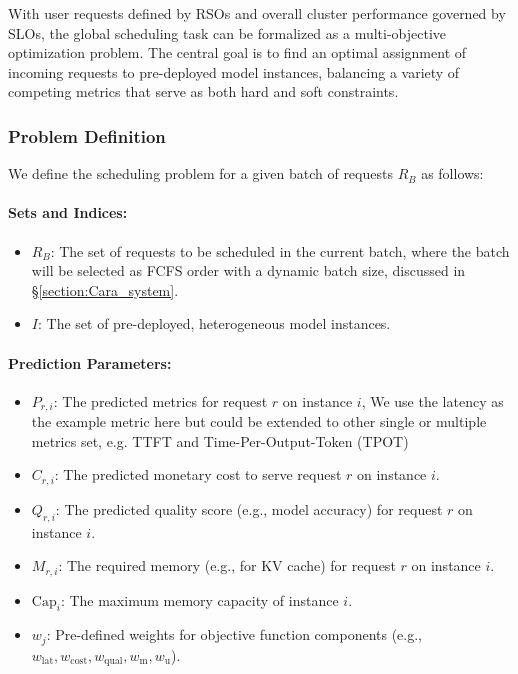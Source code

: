 \documentclass[letterpaper, anonymous, twocolumn, 10pt]{article}
\begin{document}
With user requests defined by RSOs and overall cluster performance governed by SLOs, the global scheduling task can be formalized as a multi-objective optimization problem. The central goal is to find an optimal assignment of incoming requests to pre-deployed model instances, balancing a variety of competing metrics that serve as both hard and soft constraints.

\subsubsection{Problem Definition}
We define the scheduling problem for a given batch of requests $R_B$ as follows:

\paragraph{Sets and Indices:}
\begin{itemize}
    \item $R_B$: The set of requests to be scheduled in the current batch, where the batch will be selected as FCFS order with a dynamic batch size, discussed in \S \ref{section:Cara_system}.
    \item $I$: The set of pre-deployed, heterogeneous model instances.
\end{itemize}

\paragraph{Prediction Parameters:}
\begin{itemize}
    \item $P_{r,i}$: The predicted metrics for request $r$ on instance $i$, 
    We use the latency as the example metric here but could be extended to other single or multiple metrics set, e.g. TTFT and Time-Per-Output-Token  (TPOT)
    \item $C_{r,i}$: The predicted monetary cost to serve request $r$ on instance $i$.
    \item $Q_{r,i}$: The predicted quality score (e.g., model accuracy) for request $r$ on instance $i$.
    \item $M_{r,i}$: The required memory (e.g., for KV cache) for request $r$ on instance $i$.
    \item $\mathrm{Cap}_i$: The maximum memory capacity of instance $i$.
    \item $w_j$: Pre-defined weights for objective function components (e.g., $w_{\text{lat}}, w_{\text{cost}}, w_{\text{qual}}, w_{\text{m}}, w_{\text{u}}$).
\end{itemize}
\end{document}

